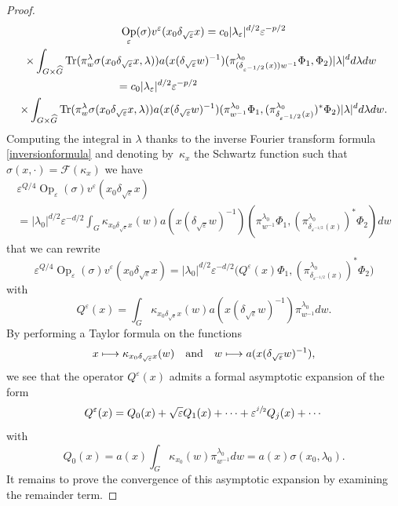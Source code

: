 \documentclass[10pt]{amsart}
\let\mathcal\mathscr
\newcommand\mto{\mathchoice{\longmapsto}{\mapsto}{\mapsto}{\mapsto}}
\DeclareMathOperator{\Op}{Op}
\DeclareMathOperator{\Tr}{Tr}
\theoremstyle{plain}
\theoremstyle{definition}
\let\eps\varepsilon
\begin{document}
\begin{proof}
\begin{multline*}
\Op_\eps(\sigma) v^\eps(x_0\delta_{\sqrt\eps}x)
= c_0 |\lambda_\eps|^{d/2}\eps^{-p/2} \\
\shoveright{\times \int_{G\times \widehat G} \Tr (\pi^{\lambda}_{w }\sigma(x_0\delta_{\sqrt\eps} x,\lambda))
a(x (\delta_{\sqrt\eps} w)^{-1}) (\pi_{ (\delta_{\eps^{-1/2}} (x))w^{-1} }^{\lambda_0} \Phi_1, \Phi_2) |\lambda|^d d\lambda dw}\\
\shoveleft{\hphantom{\Op_\eps(\sigma) v^\eps(x_0\delta_{\sqrt\eps}x)}\, =c_0 |\lambda_\eps|^{d/2}\eps^{-p/2}} \\
\times \int_{G\times \widehat G} \Tr (\pi^{\lambda}_{w }\sigma(x_0\delta_{\sqrt\eps} x,\lambda))
a(x (\delta_{\sqrt\eps} w)^{-1})
(\pi_{ w^{-1} }^{\lambda_0} \Phi_1,
(\pi^{\lambda_0}_{\delta_{\eps^{-1/2} }(x)})^*\Phi_2) |\lambda|^d d\lambda dw.
\end{multline*}
Computing the integral in $\lambda$ thanks to the inverse Fourier transform formula \eqref{inversionformula} and denoting by~$\kappa_x$ the Schwartz function such that $\sigma(x,\cdot)=
\mathcal F(\kappa_x)$ we have
\begin{multline*}
\eps^{Q/4} \Op_\eps(\sigma) v^\eps(x_0\delta_{\sqrt\eps}x)\\
= |\lambda_0|^{d/2}\eps^{-d/2} \int_{G} \kappa_{x_0\delta_{\sqrt\eps} x}(w)
a(x (\delta_{\sqrt\eps} w)^{-1})
(\pi_{ w^{-1} }^{\lambda_0} \Phi_1,
(\pi^{\lambda_0}_{\delta_{\eps^{-1/2} }(x)})^*\Phi_2) dw
\end{multline*}
that we can rewrite
\[
\eps^{Q/4} \Op_\eps(\sigma) v^\eps(x_0\delta_{\sqrt\eps}x)
= |\lambda_0|^{d/2}\eps^{-d/2} \bigl(Q^\eps(x) \Phi_1,
(\pi^{\lambda_0}_{\delta_{\eps^{-1/2} }(x)})^*\Phi_2\bigr)
\]
with
\[
Q^\eps(x)=
\int_{G} \kappa_{x_0\delta_{\sqrt\eps} x}(w)
a(x (\delta_{\sqrt\eps} w)^{-1})
\pi_{ w^{-1} }^{\lambda_0} dw.
\]
By performing a Taylor formula on the functions
\[
x\mto \kappa_{x_0\delta_{\sqrt\eps} x}(w)\quad\text{and}\quad w \mto a(x (\delta_{\sqrt\eps} w)^{-1}) ,
\]
we see that the operator $Q^\eps(x)$ admits a formal asymptotic expansion of the form
\begin{equation}\label{expansion:Q}
Q^\eps(x)= Q_0(x)+\sqrt\eps Q_1(x) + \cdots +\eps^{\sfrac j 2} Q_j(x) +\cdots
\end{equation}
with
\[
Q_0(x)= a(x) \int_{G} \kappa_{x_0}(w)
\pi_{ w^{-1} }^{\lambda_0} dw=a(x) \sigma(x_0,\lambda_0).
\]
It remains to prove the convergence of this asymptotic expansion by examining the remainder term.


\end{proof}
\end{document}

